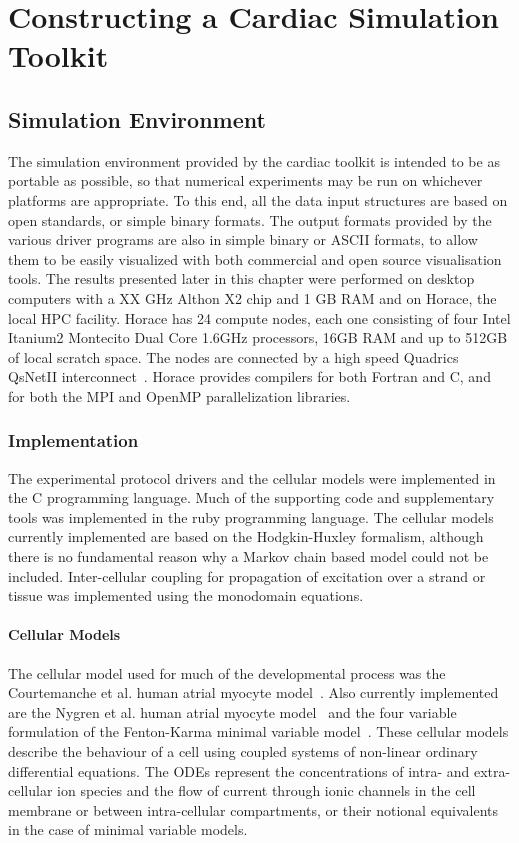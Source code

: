 \chapter{Constructing a Cardiac Simulation Toolkit}

\section{Simulation Environment}

The simulation environment provided by the cardiac toolkit is intended to be as
portable as possible, so that numerical experiments may be run on whichever
platforms are appropriate.  To this end, all the data input structures are based
on open standards, or simple binary formats.  The output formats provided by the
various driver programs are also in simple binary or ASCII formats, to allow
them to be easily visualized with both commercial and open source visualisation
tools.  The results presented later in this chapter were performed on desktop
computers with a XX GHz Althon X2 chip and 1 GB RAM and on Horace, the local HPC
facility.  Horace has 24 compute nodes, each one consisting of four Intel Itanium2
Montecito Dual Core 1.6GHz processors, 16GB RAM and up to 512GB of local scratch
space.  The nodes are connected by a high speed Quadrics QsNetII
interconnect~\cite{horace}.  Horace provides compilers for both Fortran and C,
and for both the MPI and OpenMP parallelization libraries.

\subsection{Implementation}

The experimental protocol drivers and the cellular models were implemented in
the C programming language.
Much of the supporting code and supplementary tools was implemented in the ruby
programming language.
The cellular models currently implemented are based on the Hodgkin-Huxley
formalism, although there is no fundamental reason why a Markov chain based
model could not be included.
Inter-cellular coupling for propagation of excitation over a strand or tissue
was implemented using the monodomain equations.

\subsubsection{Cellular Models}

The cellular model used for much of the developmental process was the
Courtemanche et al. human atrial myocyte model~\cite{CRN98}.
Also currently implemented are the Nygren et al. human atrial myocyte
model~\cite{nygren98} and the four variable formulation of the Fenton-Karma
minimal variable model~\cite{Bueno-Orovio2008}.
These cellular models describe the behaviour of a cell using coupled systems of
non-linear ordinary differential equations.
The ODEs represent the concentrations of intra- and extra-cellular ion species
and the flow of current through ionic channels in the cell membrane or between
intra-cellular compartments, or their notional equivalents in the case of
minimal variable models.

